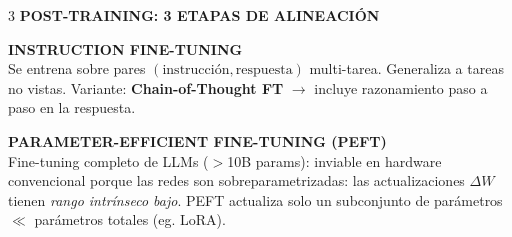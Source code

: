 \documentclass[8pt,a4paper,landscape,fleqn]{extarticle}
\begin{document}
\begin{multicols*}{3}
\textbf{POST-TRAINING: 3 ETAPAS DE ALINEACIÓN}
\vspace{-2pt}
\begin{center}
\end{center}
\vspace{-2mm} 
\textbf{INSTRUCTION FINE-TUNING}\\
Se entrena sobre pares $(\text{instrucción}, \text{respuesta})$ multi-tarea. Generaliza a tareas no vistas. Variante: \textbf{Chain-of-Thought FT} $\rightarrow$ incluye razonamiento paso a paso en la respuesta.
 
\textbf{PARAMETER-EFFICIENT FINE-TUNING (PEFT)}\\
Fine-tuning completo de LLMs ($>$10B params): inviable en hardware convencional porque las redes son sobreparametrizadas: las actualizaciones $\Delta W$ tienen \textit{rango intrínseco bajo}. PEFT actualiza solo un subconjunto de parámetros $\ll$ parámetros totales (eg. LoRA).
 
 

\end{multicols*}
\end{document}
